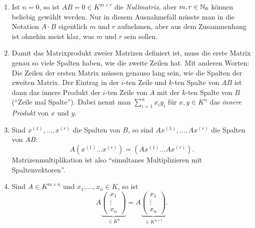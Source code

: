 \documentclass[../../main.tex]{subfiles}
\begin{document}
\begin{bem}\label{7.2.2}
\begin{enumerate}[\normalfont(a)]
\item Ist $n=0$, so ist $AB=0\in K^{m\times r}$ die \emph{Nullmatrix}, aber $m,r\in\mathbb N_0$ können beliebig gewählt werden. Nur in diesem Ausnahmefall müsste man in die Notation
$A\cdot B$ eigentlich $m$ und $r$ aufnehmen, aber aus dem Zusammenhang ist ohnehin meist klar, was $m$ und $r$ sein sollen.
\item Damit das Matrixprodukt zweier Matrizen definiert ist, muss die erste Matrix genau so viele Spalten haben, wie die zweite Zeilen hat. Mit anderen Worten: Die Zeilen der ersten
Matrix müssen genauso lang sein, wie die Spalten der zweiten Matrix. Der Eintrag in der $i$-ten Zeile und $k$-ten Spalte von $AB$ ist dann das innere Produkt der $i$-ten Zeile
von $A$ mit der $k$-ten Spalte von $B$ ("`Zeile mal Spalte"'). Dabei nennt man $\sum_{i=1}^nx_iy_i$ für $x,y\in K^n$ das \emph{innere Produkt} von $x$ und $y$.
\item\label{sim}
Sind $x^{(1)},\dots,x^{(r)}$ die Spalten von $B$, so sind $Ax^{(1)},\dots,Ax^{(r)}$ die Spalten von $AB$:
\[A(x^{(1)}\dots x^{(r)})=(Ax^{(1)}\dots Ax^{(r)}).\]
Matrizenmultiplikation ist also "`simultanes Multiplizieren mit Spaltenvektoren"'.
\item
Sind $A\in K^{m\times n}$ und $x_1,\dots,x_n\in K$, so ist
\[A\underbrace{\begin{pmatrix}x_1\\\vdots\\x_n\end{pmatrix}}_{\in K^n}=A\underbrace{\begin{pmatrix}x_1\\\vdots\\x_n\end{pmatrix}}_{\in K^{n\times1}}.\]
\end{enumerate}
\end{bem}
\end{document}
